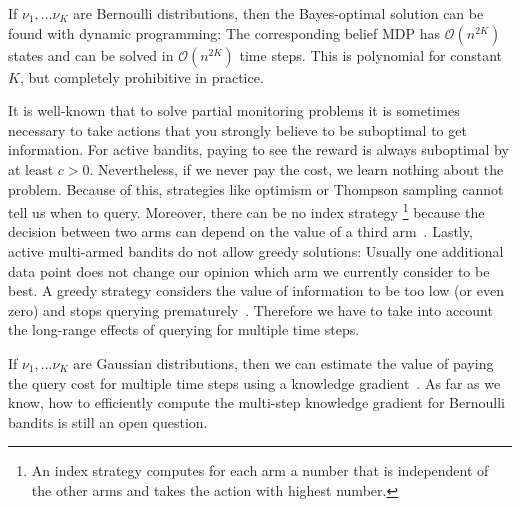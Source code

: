 \documentclass{article}
\begin{document}
If $\nu_1, \ldots \nu_K$ are Bernoulli distributions,
then the Bayes-optimal solution
can be found with dynamic programming:
The corresponding belief MDP has $\mathcal{O}(n^{2K})$ states
and can be solved in $\mathcal{O}(n^{2K})$ time steps.
This is polynomial for constant $K$,
but completely prohibitive in practice.

It is well-known that to solve partial monitoring problems
it is sometimes necessary to take actions that you strongly believe to be suboptimal to get information.
For active bandits, paying to see the reward is always suboptimal
by at least $c > 0$.
Nevertheless, if we never pay the cost, we learn nothing about the problem.
Because of this, strategies like optimism or Thompson sampling cannot tell us when to query. %
Moreover, there can be no index strategy%
\footnote{%
An index strategy computes for each arm
a number that is independent of the other arms
and takes the action with highest number.}
because the decision between two arms can depend
on the value of a third arm~\citep[Ex.~4]{Hay12}.
Lastly, active multi-armed bandits do not allow greedy solutions:
Usually one additional data point does not change our opinion
which arm we currently consider to be best.
A greedy strategy considers the value of information to be too low (or even zero) and stops querying prematurely~\citep[Sec.~5.2]{PowellRyzhov12}.
Therefore we have to take into account the long-range effects of querying for multiple time steps.

If $\nu_1, \ldots \nu_K$ are Gaussian distributions,
then we can estimate the value of paying the query cost for multiple time steps using
a knowledge gradient~\citep[Ch.~5]{PowellRyzhov12}.
As far as we know, how to efficiently compute the multi-step knowledge gradient for Bernoulli bandits is still an open question.
\end{document}
